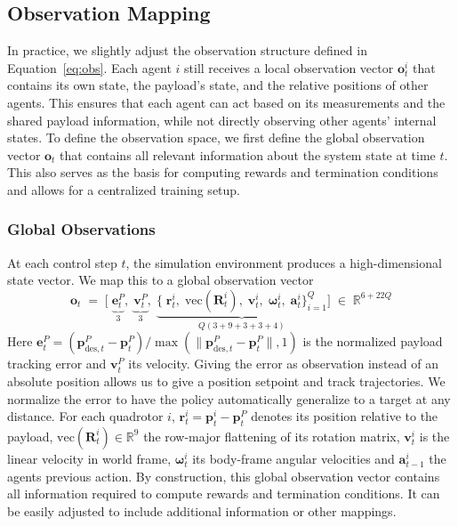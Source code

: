 \subsection{Observation Mapping}
In practice, we slightly adjust the observation structure defined in Equation~\eqref{eq:obs}. Each agent \(i\) still receives a local observation vector \(\mathbf{o}^i_t\) that contains its own state, the payload's state, and the relative positions of other agents. This ensures that each agent can act based on its measurements and the shared payload information, while not directly observing other agents' internal states. To define the observation space, we first define the global observation vector \(\mathbf{o}_t\) that contains all relevant information about the system state at time \(t\). This also serves as the basis for computing rewards and termination conditions and allows for a centralized training setup.
\subsubsection{Global Observations}
At each control step \(t\), the simulation environment produces a high-dimensional state vector. We map this to a global observation vector 
\begin{equation}
\mathbf{o}_t \;=\; \bigl[\;\underbrace{\mathbf{e}^P_t}_{3},\;\underbrace{\mathbf{v}^P_t}_{3},\;\underbrace{\{\;\mathbf{r}^i_t,\;\mathrm{vec}(\mathbf{R}^i_t),\;\mathbf{v}^i_t,\;\boldsymbol{\omega}^i_t,\;\mathbf{a}^i_t\}_{i=1}^Q}_{Q(3+9+3+3+4)}\bigr] \;\in\;\mathbb{R}^{6 + 22Q}
\end{equation}
Here \(\mathbf{e}^P_t = (\mathbf{p}^P_{\mathrm{des},t}-\mathbf{p}^P_t)/\max(\|\mathbf{p}^P_{\mathrm{des},t}-\mathbf{p}^P_t\|,1)\) is the normalized payload tracking error and \(\mathbf{v}^P_t\) its velocity. Giving the error as observation instead of an absolute position allows us to give a position setpoint and track trajectories. We normalize the error to have the policy automatically generalize to a target at any distance. For each quadrotor \(i\), \(\mathbf{r}^i_t=\mathbf{p}^i_t-\mathbf{p}^P_t\) denotes its position relative to the payload, \(\mathrm{vec}(\mathbf{R}^i_t)\in\mathbb{R}^9\) the row-major flattening of its rotation matrix, \(\mathbf{v}^i_t\) is the linear velocity in world frame, \(\boldsymbol{\omega}^i_t\) its body-frame angular velocities and \(\mathbf{a}^i_{t-1}\) the agents previous action. By construction, this global observation vector contains all information required to compute rewards and termination conditions. It can be easily adjusted to include additional information or other mappings.

